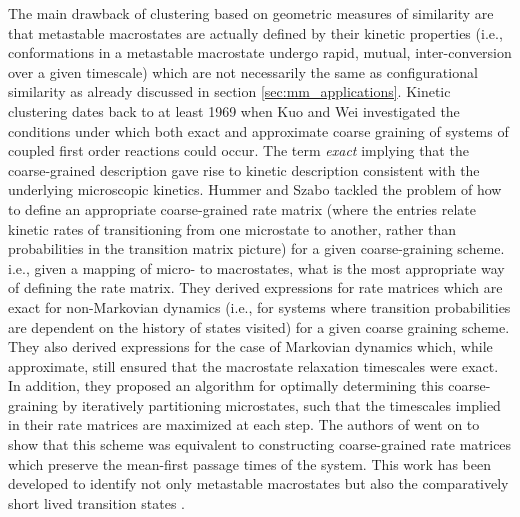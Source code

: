 The main drawback of clustering based on geometric measures of similarity are that metastable macrostates are actually defined by their kinetic properties (i.e., conformations in a metastable macrostate undergo rapid, mutual, inter-conversion over a given timescale) which are not necessarily the same \cite{schutteDirectApproachConformational1999} as configurational similarity as already discussed in section \ref{sec:mm_applications}. Kinetic clustering dates back to at least 1969 when Kuo and Wei \cite{weiLumpingAnalysisMonomolecular1969, kuoLumpingAnalysisMonomolecular} investigated the conditions under which both exact and approximate coarse graining of systems of coupled first order reactions could occur. The term \emph{exact} implying that the coarse-grained description gave rise to kinetic description consistent with the underlying microscopic kinetics.  Hummer and Szabo \cite{hummerOptimalDimensionalityReduction2015a} tackled the problem of how to define an appropriate coarse-grained rate matrix (where the entries relate kinetic rates of transitioning from one microstate to another, rather than probabilities in the transition matrix picture) for a given coarse-graining scheme. i.e., given a mapping of micro- to macrostates, what is the most appropriate way of defining the rate matrix.  They derived expressions for rate matrices which are exact for non-Markovian dynamics (i.e., for systems where transition probabilities are dependent on the history of states visited) for a given coarse graining scheme.  They also derived expressions for the case of Markovian dynamics which, while approximate, still ensured that the macrostate relaxation timescales were exact. In addition, they proposed an algorithm for optimally determining this coarse-graining by iteratively partitioning microstates, such that the timescales implied in their rate matrices are maximized at each step. The authors of \cite{kellsCorrelationFunctionsMean2020} went on to show that this scheme was equivalent to constructing coarse-grained rate matrices which preserve the mean-first passage times of the system. This work has been developed to identify not only metastable macrostates but also the comparatively short lived transition states \cite{martiniVariationalIdentificationMarkovian2017}. 

